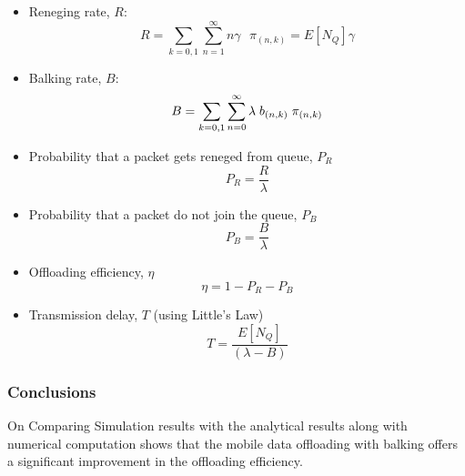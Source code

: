 \begin{itemize}
\item Reneging rate, $R$:
\begin{equation} \label{eq:8}
R= \sum_{k=0,1}^{ }\sum_{n=1}^{\infty}n \gamma \textit{   } \pi_{(n,k)} = E[N_{Q}] \gamma \nonumber 
\end{equation}
\item Balking rate, $B$:
\begin{equation}\label{eq:9}
B= \sum_{k=0,1}^{ }\sum_{n=0}^{\infty} \lambda\hspace{1mm}b_{(n,k)}\hspace{1mm}\pi_{(n,k)} 
  \nonumber 
\end{equation}

\item Probability that a packet gets reneged from queue, $P_{R}$ 
\begin{equation}\label{eq:10}
P_{R}=\frac{R}{\lambda}  \nonumber
\end{equation}
\item Probability that a packet do not join the queue, $P_{B}$
\begin{equation}\label{eq:10}
P_{B}=\frac{B}{\lambda}  \nonumber 
\end{equation}
\item Offloading efficiency, $\eta$
\begin{equation}\label{eq:12}
\eta=1-P_{R}-P_{B}  \nonumber 
\end{equation}
\item Transmission delay, $T$ (using Little's Law)
\begin{equation}\label{eq:11}
T=\frac{E[N_{Q}]}{(\lambda-B)}  \nonumber 
\end{equation}
\end{itemize}

\subsubsection{Conclusions}
On Comparing Simulation  results with the analytical results along with numerical computation shows that the mobile data offloading with balking offers a significant improvement in the offloading efficiency.





